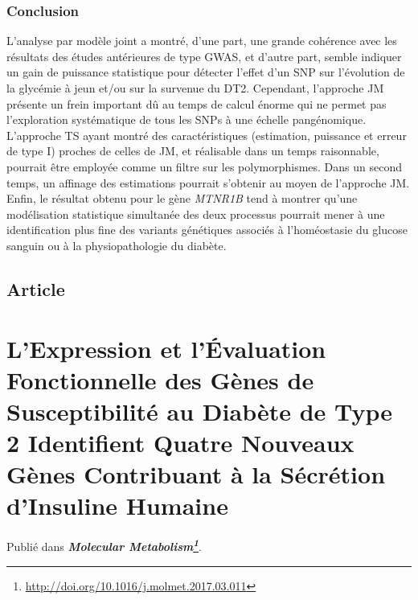 \documentclass[11pt,a4paper,notrimn]{krantz}
\renewcommand{\href}[2]{#2\footnote{\url{#1}}}
\theoremstyle{definition}
\theoremstyle{definition}
\theoremstyle{remark}
\begin{document}
\subsection{Conclusion}\label{conclusion}

L'analyse par modèle joint a montré, d'une part, une grande cohérence
avec les résultats des études antérieures de type GWAS, et d'autre part,
semble indiquer un gain de puissance statistique pour détecter l'effet
d'un SNP sur l'évolution de la glycémie à jeun et/ou sur la survenue du
DT2. Cependant, l'approche JM présente un frein important dû au temps de
calcul énorme qui ne permet pas l'exploration systématique de tous les
SNPs à une échelle pangénomique. L'approche TS ayant montré des
caractéristiques (estimation, puissance et erreur de type I) proches de
celles de JM, et réalisable dans un temps raisonnable, pourrait être
employée comme un filtre sur les polymorphismes. Dans un second temps,
un affinage des estimations pourrait s'obtenir au moyen de l'approche
JM. Enfin, le résultat obtenu pour le gène \emph{MTNR1B} tend à montrer
qu'une modélisation statistique simultanée des deux processus pourrait
mener à une identification plus fine des variants génétiques associés à
l'homéostasie du glucose sanguin ou à la physiopathologie du diabète.

\section{Article}\label{article}

\clearpage





\chapter{L'Expression et l'Évaluation Fonctionnelle des Gènes de
Susceptibilité au Diabète de Type 2 Identifient Quatre Nouveaux Gènes
Contribuant à la Sécrétion d'Insuline Humaine}\label{Article2}

Publié dans
\textbf{\emph{\href{http://doi.org/10.1016/j.molmet.2017.03.011}{Molecular Metabolism}}}.
\end{document}
